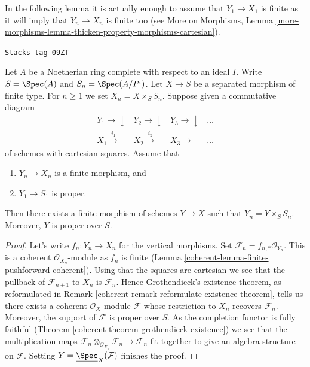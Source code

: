In the following lemma it is actually enough to assume that $Y_1 \to X_1$
is finite as it will imply that $Y_n \to X_n$ is finite too
(see More on Morphisms, Lemma
\ref{more-morphisms-lemma-thicken-property-morphisms-cartesian}).

\begin{lemma}
\label{coherent-lemma-algebraize-formal-scheme-finite-over-proper}
\href{https://stacks.math.columbia.edu/tag/09ZT}{\texttt{Stacks tag 09ZT}}

Let $A$ be a Noetherian ring complete with respect to an ideal $I$.
Write $S = \Spec(A)$ and $S_n = \Spec(A/I^n)$.
Let $X \to S$ be a separated morphism of finite type.
For $n \geq 1$ we set $X_n = X \times_S S_n$.
Suppose given a commutative diagram
$$
\begin{array}{cccc}Y_1 \longrightarrow\downarrow & Y_2 \longrightarrow\downarrow & Y_3 \longrightarrow\downarrow & \ldots \\ X_1 \overset{i_1}{\longrightarrow} & X_2 \overset{i_2}{\longrightarrow} & X_3 \longrightarrow & \ldots\end{array}
$$
of schemes with cartesian squares. Assume that
\begin{enumerate}
\item $Y_n \to X_n$ is a finite morphism, and
\item $Y_1 \to S_1$ is proper.
\end{enumerate}
Then there exists a finite morphism of schemes $Y \to X$ such that
$Y_n = Y \times_S S_n$. Moreover, $Y$ is proper over $S$.
\end{lemma}

\begin{proof}

Let's write $f_n : Y_n \to X_n$ for the vertical morphisms.
Set $\mathcal{F}_n = f_{n, *}\mathcal{O}_{Y_n}$. This is
a coherent $\mathcal{O}_{X_n}$-module as $f_n$ is finite
(Lemma \ref{coherent-lemma-finite-pushforward-coherent}).
Using that the squares are cartesian we see that
the pullback of $\mathcal{F}_{n + 1}$ to $X_n$ is $\mathcal{F}_n$.
Hence Grothendieck's existence theorem, as reformulated in
Remark \ref{coherent-remark-reformulate-existence-theorem},
tells us there exists a coherent $\mathcal{O}_X$-module
$\mathcal{F}$ whose restriction to $X_n$ recovers $\mathcal{F}_n$.
Moreover, the support of $\mathcal{F}$ is proper over $S$.
As the completion functor is fully faithful
(Theorem \ref{coherent-theorem-grothendieck-existence})
we see that the multiplication maps
$\mathcal{F}_n \otimes_{\mathcal{O}_{X_n}} \mathcal{F}_n \to
\mathcal{F}_n$ fit together to give an algebra structure on $\mathcal{F}$.
Setting $Y = \underline{\Spec}_X(\mathcal{F})$ finishes the proof.
\end{proof}

